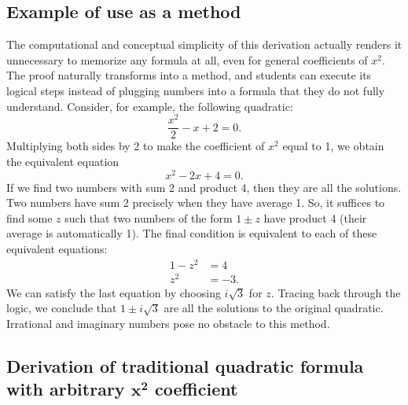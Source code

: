 \documentclass[11pt]{article}
\begin{document}
\subsection{Example of use as a method}
\label{sec:example}

The computational and conceptual simplicity of this derivation actually
renders it unnecessary to memorize any formula at all, even for general
coefficients of $x^2$. The proof naturally transforms into a method, and
students can execute its logical steps instead of plugging numbers into a
formula that they do not fully understand. Consider, for example, the
following quadratic:
\begin{displaymath}
  \frac{x^2}{2} - x + 2 = 0.
\end{displaymath}
Multiplying both sides by 2 to make the coefficient of $x^2$ equal to 1, we
obtain the equivalent equation
\begin{displaymath}
  x^2 - 2x + 4 = 0.
\end{displaymath}
If we find two numbers with sum 2 and product 4, then they are all the
solutions. Two numbers have sum 2 precisely when they have average 1.  So, it
suffices to find some $z$ such that two numbers of the form $1 \pm z$ have
product 4 (their average is automatically 1). The final condition is equivalent
to each of these equivalent equations:
\begin{align*}
  1 - z^2 &= 4 \\
  z^2 &= -3.
\end{align*}
We can satisfy the last equation by choosing $i \sqrt{3}$ for $z$. Tracing back
through the logic, we conclude that $1 \pm i \sqrt{3}$ are all the solutions to
the original quadratic. Irrational and imaginary numbers pose no obstacle to
this method.


\subsection{Derivation of traditional quadratic formula with arbitrary
  $\boldsymbol{x^2}$ coefficient}
\end{document}
